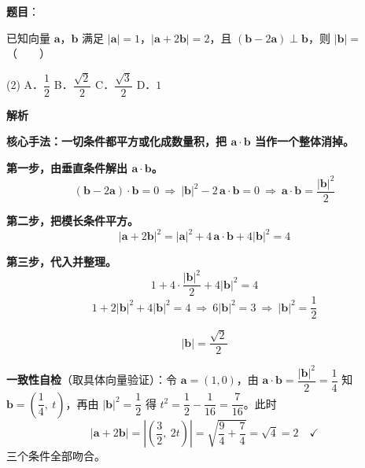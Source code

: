 \begin{answer}

\textbf{题目}：

已知向量 $\boldsymbol a$，$\boldsymbol b$ 满足 $|\boldsymbol a|=1$，$|\boldsymbol a+2\boldsymbol b|=2$，且 $(\boldsymbol b-2\boldsymbol a)\perp\boldsymbol b$，则 $|\boldsymbol b|=$\mbox{（　　）}

\begin{gkopts}(2)
\task A．$\dfrac12$
\task B．$\dfrac{\sqrt2}2$
\task C．$\dfrac{\sqrt3}2$
\task D．$1$
\end{gkopts}

\textbf{解析}

\textbf{核心手法：一切条件都平方或化成数量积，把 $\boldsymbol a\cdot\boldsymbol b$ 当作一个整体消掉。}

\textbf{第一步，由垂直条件解出 $\boldsymbol a\cdot\boldsymbol b$。}
\nopagebreak[4]
\[(\boldsymbol b-2\boldsymbol a)\cdot\boldsymbol b=0\ \Longrightarrow\ |\boldsymbol b|^{2}-2\,\boldsymbol a\cdot\boldsymbol b=0\ \Longrightarrow\ \boldsymbol a\cdot\boldsymbol b=\frac{|\boldsymbol b|^{2}}2\]

\textbf{第二步，把模长条件平方。}
\nopagebreak[4]
\[|\boldsymbol a+2\boldsymbol b|^{2}=|\boldsymbol a|^{2}+4\,\boldsymbol a\cdot\boldsymbol b+4|\boldsymbol b|^{2}=4\]

\textbf{第三步，代入并整理。}
\nopagebreak[4]
\[1+4\cdot\frac{|\boldsymbol b|^{2}}2+4|\boldsymbol b|^{2}=4\]
\nopagebreak[4]
\[1+2|\boldsymbol b|^{2}+4|\boldsymbol b|^{2}=4\ \Longrightarrow\ 6|\boldsymbol b|^{2}=3\ \Longrightarrow\ |\boldsymbol b|^{2}=\frac12\]

\nopagebreak[4]
\[|\boldsymbol b|=\frac{\sqrt2}2\]

\begin{gktip}
\textbf{一致性自检}（取具体向量验证）：令 $\boldsymbol a=(1,0)$，由 $\boldsymbol a\cdot\boldsymbol b=\dfrac{|\boldsymbol b|^{2}}2=\dfrac14$ 知 $\boldsymbol b=\left(\dfrac14,\ t\right)$，再由 $|\boldsymbol b|^{2}=\dfrac12$ 得 $t^{2}=\dfrac12-\dfrac1{16}=\dfrac7{16}$。此时
\nopagebreak[4]
\[|\boldsymbol a+2\boldsymbol b|=\left|\left(\frac32,\ 2t\right)\right|=\sqrt{\frac94+\frac74}=\sqrt4=2\quad\checkmark\]
三个条件全部吻合。
\end{gktip}


\par\medskip

\end{answer}
